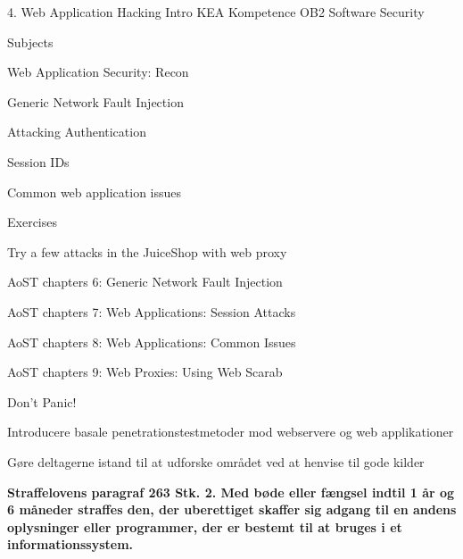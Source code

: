 \documentclass[Screen16to9,17pt]{foils}
\begin{document}
\mytitlepage
{4. Web Application Hacking Intro}
{KEA Kompetence OB2 Software Security}



\begin{list1}
\item Subjects
\item Web Application Security: Recon
\begin{list2}
\item Generic Network Fault Injection
\item Attacking Authentication
\item Session IDs
\item Common web application issues
\end{list2}
\item Exercises
\begin{list2}
\item  Try a few attacks in the JuiceShop with web proxy
\end{list2}
\end{list1}


\begin{list1}
\item AoST chapters 6: Generic Network Fault Injection
\item AoST chapters 7: Web Applications: Session  Attacks
\item AoST chapters 8: Web Applications: Common Issues
\item AoST chapters 9: Web Proxies: Using Web Scarab
\end{list1}


\centerline{\color{titlecolor}\LARGE Don't Panic!}


\begin{list1}
\item Introducere basale penetrationstestmetoder mod webservere og web
  applikationer
\item Gøre deltagerne istand til at udforske området ved at henvise
  til gode kilder
\end{list1}



{\bfseries Straffelovens paragraf 263 Stk. 2. Med bøde eller fængsel indtil 1 år og 6 måneder straffes den, der uberettiget skaffer sig adgang til en andens oplysninger eller programmer, der er bestemt til at bruges i et informationssystem. }
\end{document}
